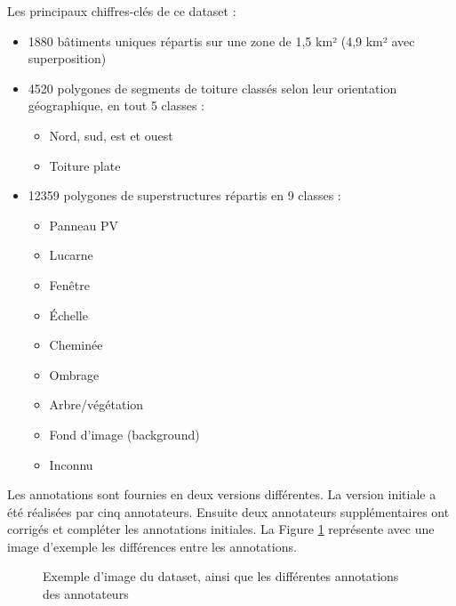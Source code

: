 {{{{\par{Les principaux chiffres-clés de ce dataset :}
\begin{itemize}
    \item 1880 bâtiments uniques répartis sur une zone de 1,5 km² (4,9 km² avec superposition)
    \item 4520 polygones de segments de toiture classés selon leur orientation géographique, en tout 5 classes :
    \begin{itemize}
        \item Nord, sud, est et ouest
        \item Toiture plate
    \end{itemize}
    \item 12359 polygones de superstructures répartis en 9 classes :
    \begin{itemize}
        \item Panneau PV
        \item Lucarne
        \item Fenêtre
        \item Échelle
        \item Cheminée
        \item Ombrage
        \item Arbre/végétation
        \item Fond d'image (background)
        \item Inconnu
    \end{itemize}
\end{itemize}
\par{Les annotations sont fournies en deux versions différentes. La version initiale a été réalisées par cinq annotateurs. Ensuite deux annotateurs supplémentaires ont corrigés et compléter les annotations initiales. La Figure \ref{fig:rid_dataset_image_sample} représente avec une image d'exemple les différences entre les annotations.}

\begin{figure}[H]
    \caption{Exemple d'image du dataset, ainsi que les différentes annotations des annotateurs \cite{krapf_rid_2021}}
    \label{fig:rid_dataset_image_sample}
\end{figure}

}}}}
